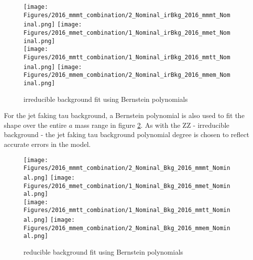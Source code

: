 \begin{figure}[ht!b]
  \centering
  \texttt{[image: Figures/2016\_mmmt\_combination/2\_Nominal\_irBkg\_2016\_mmmt\_Nominal.png]}
  \texttt{[image: Figures/2016\_mmet\_combination/1\_Nominal\_irBkg\_2016\_mmet\_Nominal.png]}\\
  \texttt{[image: Figures/2016\_mmtt\_combination/1\_Nominal\_irBkg\_2016\_mmtt\_Nominal.png]}
  \texttt{[image: Figures/2016\_mmem\_combination/2\_Nominal\_irBkg\_2016\_mmem\_Nominal.png]}\\
    \caption{\label{fig:fit_ZZ} irreducible background fit using Bernstein polynomials}
\end{figure}

For the jet faking tau background, a Bernstein polynomial is also used to fit the shape over the entire $a$ mass range in figure \ref{fig:fit_FF}. As with the ZZ - irreducible background - the jet faking tau background polynomial degree is chosen to reflect accurate errors in the model. 



\begin{figure}[ht!b]
  \centering
  \texttt{[image: Figures/2016\_mmmt\_combination/2\_Nominal\_Bkg\_2016\_mmmt\_Nominal.png]}
  \texttt{[image: Figures/2016\_mmet\_combination/1\_Nominal\_Bkg\_2016\_mmet\_Nominal.png]}\\
  \texttt{[image: Figures/2016\_mmtt\_combination/1\_Nominal\_Bkg\_2016\_mmtt\_Nominal.png]}
  \texttt{[image: Figures/2016\_mmem\_combination/2\_Nominal\_Bkg\_2016\_mmem\_Nominal.png]}\\
    \caption{\label{fig:fit_FF} reducible background fit using Bernstein polynomials}
\end{figure}

